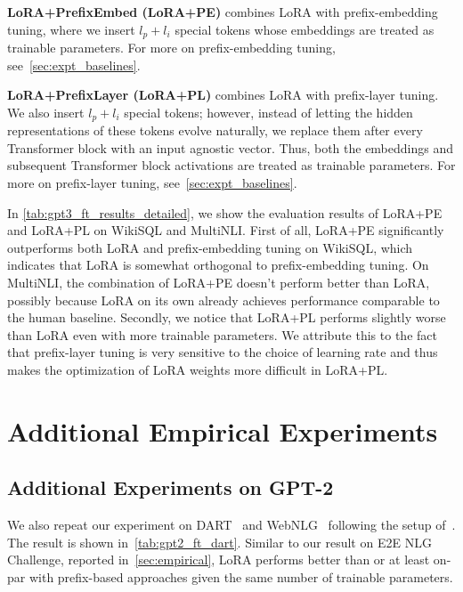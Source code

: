 \documentclass{article} %
\begin{document}
\textbf{LoRA+PrefixEmbed (LoRA+PE)} combines LoRA with prefix-embedding tuning, where we insert $l_p+l_i$ special tokens whose embeddings are treated as trainable parameters.
For more on prefix-embedding tuning, see~\autoref{sec:expt_baselines}.

\textbf{LoRA+PrefixLayer (LoRA+PL)} combines LoRA with prefix-layer tuning.
We also insert $l_p+l_i$ special tokens; however, instead of letting the hidden representations of these tokens evolve naturally, we replace them after every Transformer block with an input agnostic vector.
Thus, both the embeddings and subsequent Transformer block activations are treated as trainable parameters.
For more on prefix-layer tuning, see~\autoref{sec:expt_baselines}.

In \autoref{tab:gpt3_ft_results_detailed}, we show the evaluation results of LoRA+PE and LoRA+PL on WikiSQL and MultiNLI.
First of all, LoRA+PE significantly outperforms both LoRA and prefix-embedding tuning on WikiSQL, which indicates that LoRA is somewhat orthogonal to prefix-embedding tuning.
On MultiNLI, the combination of LoRA+PE doesn't perform better than LoRA, possibly because LoRA on its own  already achieves performance comparable to the human baseline.
Secondly, we notice that LoRA+PL performs slightly worse than LoRA even with more trainable parameters.
We attribute this to the fact that prefix-layer tuning is very sensitive to the choice of learning rate and thus makes the optimization of LoRA weights more difficult in LoRA+PL. 





\section{Additional Empirical Experiments}
\label{app:extra_expt}

\subsection{Additional Experiments on GPT-2}
\label{app:gpt2_extra}

We also repeat our experiment on DART~\citep{nan2020dart} and WebNLG~\citep{gardent2017webnlg} following the setup of~\cite{li_prefix-tuning_2021}.
The result is shown in~\autoref{tab:gpt2_ft_dart}.
Similar to our result on E2E NLG Challenge, reported in~\autoref{sec:empirical}, LoRA performs better than or at least on-par with prefix-based approaches given the same number of trainable parameters.
\end{document}
